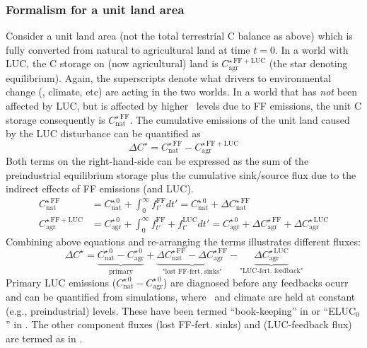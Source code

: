 \subsubsection{Formalism for a unit land area}
Consider a unit land area (not the total terrestrial C balance as above) which is fully converted from natural to agricultural land at time $t=0$. In a world with LUC, the C storage on (now agricultural) land is $C^{\star\,\mathrm{FF+LUC}}_{\mathrm{agr}}$ (the star denoting equilibrium). Again, the superscripts denote what drivers to environmental change (\coo , climate, etc) are acting in the two worlds. In a world that has {\it not} been affected by LUC, but is affected by higher \coo\ levels due to FF emissions, the unit C storage consequently is $C^{\star\,\mathrm{FF}}_{\mathrm{nat}}$. The cumulative emissions of the unit land caused by the LUC disturbance can be quantified as
\begin{equation}
\Delta C^{\star}=C^{\star\,\mathrm{FF}}_{\mathrm{nat}} - C^{\star\,\mathrm{FF+LUC}}_{\mathrm{agr}}
\end{equation}
Both terms on the right-hand-side can be expressed as the sum of the preindustrial equilibrium storage plus the cumulative sink/source flux due to the indirect effects of FF emissions (and LUC).
\begin{align}
C^{\star\,\mathrm{FF}}_{\mathrm{nat}} &= C^{\star\,0}_{\mathrm{nat}}+\int_{0}^{\infty} f^{\mathrm{FF}}_{t'}dt' = C^{\star\,0}_{\mathrm{nat}}+\Delta C^{\star\,\mathrm{FF}}_{\mathrm{nat}}\\
C^{\star\,\mathrm{FF+LUC}}_{\mathrm{agr}} &= C^{\star\,0}_{\mathrm{agr}}+\int_{0}^{\infty} f^{\mathrm{FF}}_{t'}+f^{\mathrm{LUC}}_{t'}dt' = C^{\star\,0}_{\mathrm{agr}}+\Delta C^{\star\,\mathrm{FF}}_{\mathrm{agr}}+\Delta C^{\star\,\mathrm{LUC}}_{\mathrm{agr}}
\end{align}
Combining above equations and re-arranging the terms illustrates different fluxes:
\begin{equation}
\Delta C^{\star} = 
\underbrace{C^{\star\,0}_{\mathrm{nat}} - C^{\star\,0}_{\mathrm{agr}} }_\text{primary}
+ \underbrace{\Delta C^{\star\,\mathrm{FF}}_{\mathrm{nat}} - \Delta C^{\star\,\mathrm{FF}}_{\mathrm{agr}}  }_\text{"lost FF-fert. sinks"}
- \underbrace{\Delta C^{\star\,\mathrm{LUC}}_{\mathrm{agr}}  }_\text{"LUC-fert. feedback"}
\label{eq:components}
\end{equation}
Primary LUC emissions ($C^{\star\,0}_{\mathrm{nat}} - C^{\star\,0}_{\mathrm{agr}} $) are diagnosed before any feedbacks ocurr and can be quantified from simulations, where \coo\ and climate are held at constant (e.g., preindustrial) levels. These have been termed ``book-keeping'' in \citep{strassmann08tel} or ``ELUC$_0$'' in \citet{gasserciais13}. The other component fluxes (lost FF-fert. sinks) and (LUC-feedback flux) are termed as in \citep{strassmann08tel}.\\

